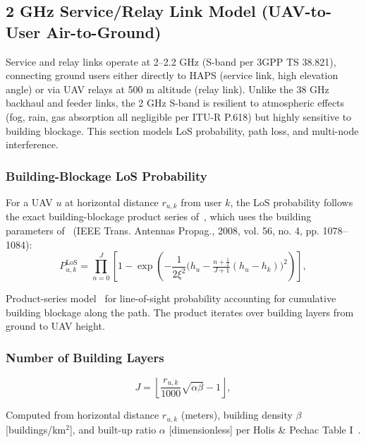 \documentclass[conference]{IEEEtran}
\begin{document}
\subsection{2 GHz Service/Relay Link Model (UAV-to-User Air-to-Ground)}

Service and relay links operate at 2--2.2 GHz (S-band per 3GPP TS 38.821), connecting ground users either directly to HAPS (service link, high elevation angle) or via UAV relays at 500 m altitude (relay link). Unlike the 38 GHz backhaul and feeder links, the 2 GHz S-band is resilient to atmospheric effects (fog, rain, gas absorption all negligible per ITU-R P.618) but highly sensitive to building blockage. This section models LoS probability, path loss, and multi-node interference.

\subsubsection{Building-Blockage LoS Probability~\cite{holispechac2008}}
For a UAV $u$ at horizontal distance $r_{u,k}$ from user $k$, the LoS
probability follows the exact building-blockage product series
of~\cite{arani2023}, which uses the building parameters of~\cite{holispechac2008} (IEEE Trans. Antennas Propag., 2008, vol. 56, no. 4, pp. 1078--1084):
\begin{equation}
P^\mathrm{LoS}_{u,k} = \prod_{n=0}^{J}\left[1-\exp\!\left(-\frac{1}{2\xi^2}
\Big(h_u-\tfrac{n+\frac12}{J+1}(h_u-h_k)\Big)^{2}\right)\right],
\label{eq:los}
\end{equation}

Product-series model~\cite{arani2023} for line-of-sight probability accounting for cumulative building blockage along the path. The product iterates over building layers from ground to UAV height.

\subsubsection{Number of Building Layers~\cite{holispechac2008}}
\begin{equation}
J = \left\lfloor \frac{r_{u,k}}{1000}\sqrt{\alpha\beta} - 1 \right\rfloor,
\label{eq:losJ}
\end{equation}

Computed from horizontal distance $r_{u,k}$ (meters), building density $\beta$ [buildings/km$^2$], and built-up ratio $\alpha$ [dimensionless] per Holis \& Pechac Table I~\cite{holispechac2008}.
\end{document}
